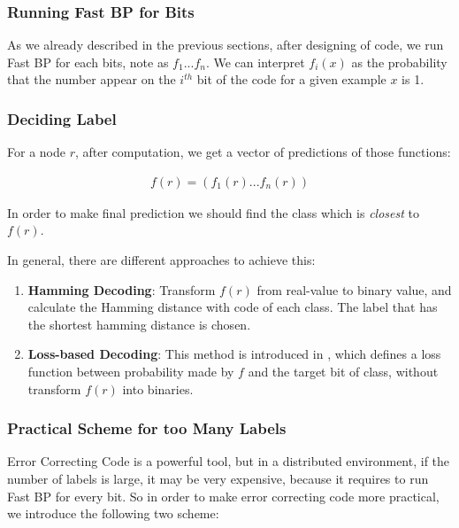 \subsubsection*{Running Fast BP for Bits}

As we already described in the previous sections, after designing of code, we run Fast BP for each bits, note as $f_{1}...f_{n}$. We can interpret $f_{i}(x)$ as the probability that the number appear on the $i^{th}$ bit of the code for a given example $x$ is 1.

\subsubsection*{Deciding Label}

For a node $r$, after computation, we get a vector of predictions of those functions:

\begin{gather*}
	f(r) = (f_{1}(r)...f_{n}(r)) 
\end{gather*}



In order to make final prediction we should find the class which is \textit{closest} to $f(r)$.

In general, there are different approaches to achieve this:

\begin{enumerate}
	\item \textbf{Hamming Decoding}: Transform $f(r)$ from real-value to binary value, and calculate the Hamming distance with code of each class. The label that has the shortest hamming distance is chosen.
	\item \textbf{Loss-based Decoding}: This method is introduced in \cite{Erin2000}, which defines a loss function between probability made by $f$ and the target bit of class, without transform $f(r)$ into binaries.
\end{enumerate}

\subsubsection*{Practical Scheme for too Many Labels}

Error Correcting Code is a powerful tool, but in a distributed environment, if the number of labels is large, it may be very expensive, because it requires to run Fast BP for every bit. So in order to make error correcting code more practical, we introduce the following two scheme:

